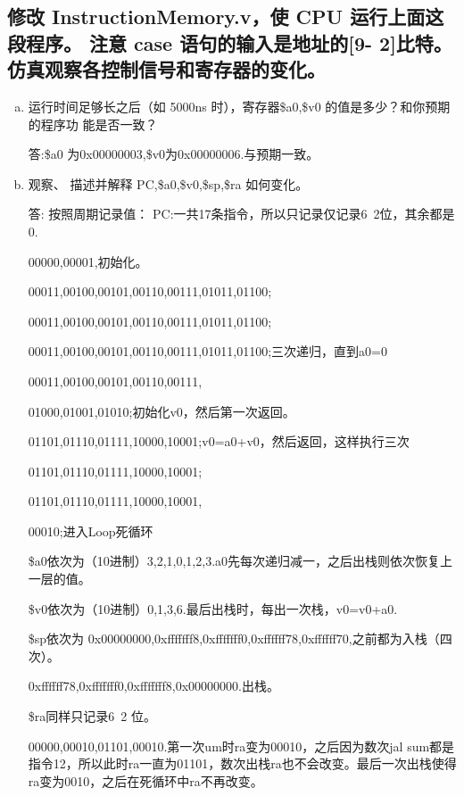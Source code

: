 \documentclass{ctexart}
\begin{document}
    \subsection{修改 InstructionMemory.v，使 CPU 运行上面这段程序。 注意 case 语句的输入是地址的[9-
2]比特。 仿真观察各控制信号和寄存器的变化。}
        \begin{enumerate}[a)]

         \item{ 运行时间足够长之后（如 5000ns 时），寄存器\$a0,\$v0 的值是多少？和你预期的程序功
             能是否一致？}
            
        答:\$a0 为0x00000003,\$v0为0x00000006.与预期一致。

        \item{观察、 描述并解释 PC,\$a0,\$v0,\$sp,\$ra 如何变化。}
            
       答: 按照周期记录值：
        PC:一共17条指令，所以只记录仅记录6~2位，其余都是0.
        
                    00000,00001,初始化。
        
                    00011,00100,00101,00110,00111,01011,01100;

                    00011,00100,00101,00110,00111,01011,01100;

                    00011,00100,00101,00110,00111,01011,01100;三次递归，直到a0=0

                    00011,00100,00101,00110,00111,
                    
                    01000,01001,01010;初始化v0，然后第一次返回。

                    01101,01110,01111,10000,10001;v0=a0+v0，然后返回，这样执行三次

                    01101,01110,01111,10000,10001;

                    01101,01110,01111,10000,10001,
                    
                    00010;进入Loop死循环

    \$a0依次为（10进制）3,2,1,0,1,2,3.a0先每次递归减一，之后出栈则依次恢复上一层的值。

    \$v0依次为（10进制）0,1,3,6.最后出栈时，每出一次栈，v0=v0+a0.

    \$sp依次为 0x00000000,0xfffffff8,0xfffffff0,0xffffff78,0xffffff70,之前都为入栈（四次）。
    
    0xffffff78,0xfffffff0,0xfffffff8,0x00000000.出栈。

    \$ra同样只记录6~2 位。

    00000,00010,01101,00010.第一次um时ra变为00010，之后因为数次jal sum都是指令12，所以此时ra一直为01101，数次出栈ra也不会改变。最后一次出栈使得ra变为0010，之后在死循环中ra不再改变。
    \end{enumerate}
\end{document}
